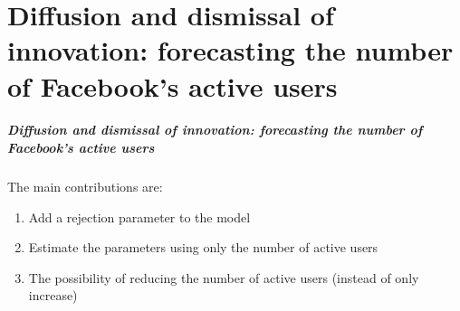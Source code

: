 \documentclass{beamer}
\begin{document}
\part{Diffusion and dismissal of innovation: forecasting the number of Facebook’s active users}
\begin{frame}
\frametitle{Diffusion and dismissal of innovation: forecasting the number of Facebook’s active users}

The main contributions are:
\begin{enumerate}[i]
\item Add a rejection parameter to the model
\item Estimate the parameters using only the number of active users
\item The possibility of reducing the number of active users (instead of only increase)
\end{enumerate}
\end{frame}
\end{document}
